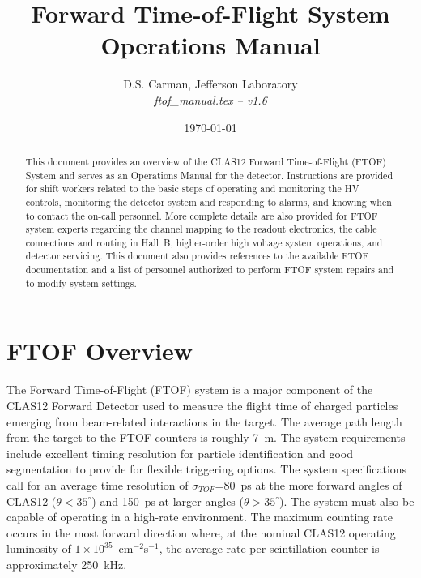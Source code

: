 \documentclass[12pt]{article}
\begin{document}
\title{Forward Time-of-Flight System Operations Manual}

\vskip 0.5cm

\author{D.S. Carman, Jefferson Laboratory\\[0.2ex]
{\it ftof\_manual.tex -- v1.6}}

\date \today
%
\maketitle

\begin{abstract}
This document provides an overview of the CLAS12 Forward Time-of-Flight (FTOF) System 
and serves as an Operations Manual for the detector. Instructions are provided for 
shift workers related to the basic steps of operating and monitoring the HV controls, 
monitoring the detector system and responding to alarms, and knowing when to contact 
the on-call personnel. More complete details are also provided for FTOF system experts 
regarding the channel mapping to the readout electronics, the cable connections and 
routing in Hall~B, higher-order high voltage system operations, and detector servicing. 
This document also provides references to the available FTOF documentation and a list 
of personnel authorized to perform FTOF system repairs and to modify system settings.
\end{abstract}

\thispagestyle{empty}

\clearpage

\vfil
\eject

\tableofcontents

\vfil
\eject

\section{FTOF Overview}
\label{intro}

The Forward Time-of-Flight (FTOF) system is a major component of the CLAS12 Forward 
Detector used to measure the flight time of charged particles emerging from 
beam-related interactions in the target. The average path length from the target to 
the FTOF counters is roughly 7~m. The system requirements include excellent timing 
resolution for particle identification and good segmentation to provide for flexible 
triggering options. The system specifications call for an average time resolution of 
$\sigma_{TOF}$=80~ps at the more forward angles of CLAS12 ($\theta < 35^\circ$) and 
150~ps at larger angles ($\theta > 35^\circ$). The system must also be capable of 
operating in a high-rate environment. The maximum counting rate occurs in the most 
forward direction where, at the nominal CLAS12 operating luminosity of 
$1 \times 10^{35}$~cm$^{-2}$s$^{-1}$, the average rate per scintillation counter is 
approximately 250~kHz.
\end{document}
